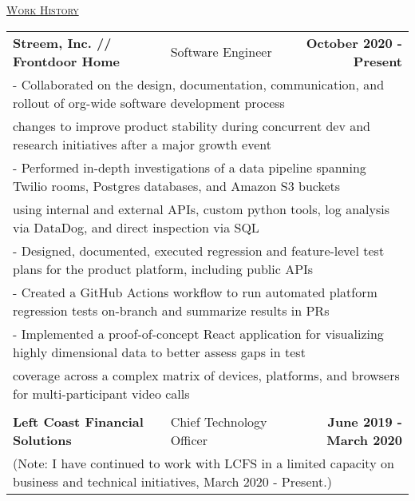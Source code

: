 \documentclass[letterpaper]{article}
\begin{document}
	\begin{center}
		\vspace{0.0in}
		\underline{\large \scshape Work History}
		\begin{tabular}{p{}p{}r}
			\\
				\textbf{Streem, Inc. // Frontdoor Home} &
				\quad\quad\quad\quad\quad\quad Software Engineer &
				\textbf{October 2020 - Present\quad}
			\\
				\multicolumn{3}{p{\textwidth}}{\quad\quad - Collaborated on the design, documentation, communication, and rollout of org-wide software development process}
			\\
				\multicolumn{3}{p{\textwidth}}{\quad\quad\quad changes to improve product stability during concurrent dev and research initiatives after a major growth event} 
			\\
				\multicolumn{3}{p{\textwidth}}{\quad\quad - Performed in-depth investigations of a data pipeline spanning Twilio rooms, Postgres databases, and Amazon S3 buckets}  
			\\
				\multicolumn{3}{p{\textwidth}}{\quad\quad\quad using internal and external APIs, custom python tools, log analysis via DataDog, and direct inspection via SQL}
			\\
				\multicolumn{3}{p{\textwidth}}{\quad\quad - Designed, documented, executed regression and feature-level test plans for the product platform, including public APIs} 
			\\
				\multicolumn{3}{p{\textwidth}}{\quad\quad - Created a GitHub Actions workflow to run automated platform regression tests on-branch and summarize results in PRs}
			\\
			    \multicolumn{3}{p{\textwidth}}{\quad\quad - Implemented a proof-of-concept React application for visualizing highly dimensional data to better assess gaps in test}
			\\
				\multicolumn{3}{p{\textwidth}}{\quad\quad\quad  coverage across a complex matrix of devices, platforms, and browsers for multi-participant video calls }
			\\
			\\
				\textbf{Left Coast Financial Solutions} &
				\quad\quad\quad\quad\quad Chief Technology Officer &
				\textbf{June 2019 - March 2020\quad}
			\\
				\multicolumn{3}{p{\textwidth}}{(Note: I have continued to work with LCFS in a limited capacity on business and technical initiatives, March 2020 - Present.)}

\end{tabular}
\end{center}
\end{document}
